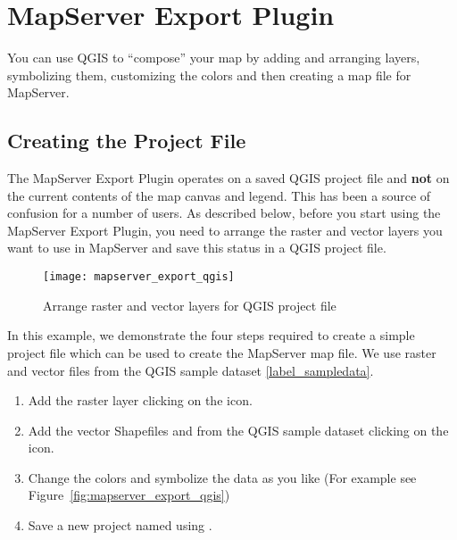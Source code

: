 
\section{MapServer Export Plugin}\label{sec:mapserver_export}


You can use QGIS to ``compose'' your map by adding and arranging layers,
symbolizing them, customizing the colors and then creating a map file
for MapServer.

\subsection{Creating the Project File}

The MapServer Export Plugin operates on a saved QGIS project file and
\textbf{not} on the current contents of the map canvas and legend. This
has been a source of confusion for a number of users. As described below,
before you start using the MapServer Export Plugin, you need to arrange
the raster and vector layers you want to use in MapServer and save this
status in a QGIS project file.

\begin{figure}[ht]
\centering
  \texttt{[image: mapserver\_export\_qgis]}
   \caption{Arrange raster and vector layers for QGIS project file \nixcaption}
  \label{fig:mapserver_export_qgs}
\end{figure}

In this example, we demonstrate the four steps required to create a simple
project file which can be used to create the MapServer map file.
We use raster and vector files from the QGIS sample dataset \ref{label_sampledata}.

\begin{enumerate}
\item Add the raster layer  clicking on the
 icon.
\item Add the vector Shapefiles  and
 from the QGIS sample dataset clicking on the
 icon.
\item Change the colors and symbolize the data as you like (For example see
Figure~\ref{fig:mapserver_export_qgis})
\item Save a new project named  using
 \arrow {}.
\end{enumerate}

